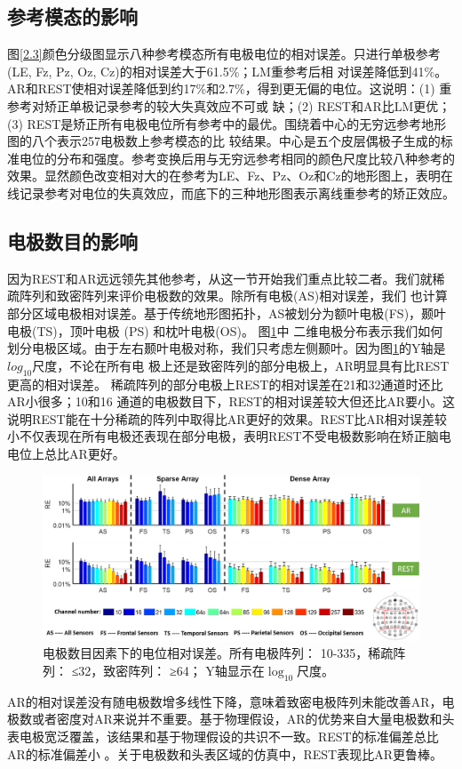 \subsection{参考模态的影响}
图\ref{2.3}颜色分级图显示八种参考模态所有电极电位的相对误差。只进行单极参考(LE, Fz, Pz, Oz, Cz)的相对误差大于61.5\%；LM重参考后相
对误差降低到41\%。AR和REST使相对误差降低到约17\%和2.7\%，得到更无偏的电位。这说明：(1) 重参考对矫正单极记录参考的较大失真效应不可或
缺；(2) REST和AR比LM更优；(3) REST是矫正所有电极电位所有参考中的最优。围绕着中心的无穷远参考地形图的八个表示257电极数上参考模态的比
较结果。中心是五个皮层偶极子生成的标准电位的分布和强度。参考变换后用与无穷远参考相同的颜色尺度比较八种参考的效果。显然颜色改变相对大的在参考为LE、Fz、Pz、Oz和Cz的地形图上，表明在线记录参考对电位的失真效应，而底下的三种地形图表示离线重参考的矫正效应。
\subsection{电极数目的影响}
因为REST和AR远远领先其他参考，从这一节开始我们重点比较二者。我们就稀疏阵列和致密阵列来评价电极数的效果。除所有电极(AS)相对误差，我们
也计算部分区域电极相对误差。基于传统地形图拓扑，AS被划分为额叶电极(FS)，颞叶电极(TS)，顶叶电极 (PS) 和枕叶电极(OS)。 图\ref{2.4}中
二维电极分布表示我们如何划分电极区域。由于左右颞叶电极对称，我们只考虑左侧颞叶。因为图\ref{2.4}的Y轴是$log_{10}$尺度，不论在所有电
极上还是致密阵列的部分电极上，AR明显具有比REST更高的相对误差。 稀疏阵列的部分电极上REST的相对误差在21和32通道时还比AR小很多；10和16
通道的电极数目下，REST的相对误差较大但还比AR要小。这说明REST能在十分稀疏的阵列中取得比AR更好的效果。REST比AR相对误差较小不仅表现在所有电极还表现在部分电极，表明REST不受电极数影响在矫正脑电电位上总比AR更好。
\begin{figure}[!ht]
	\centering
	\includegraphics[width=15cm]{pic/JNE/figure4.png}
	\caption{电极数目因素下的电位相对误差。所有电极阵列： 10-335，稀疏阵列： ≤32，致密阵列： ≥64； Y轴显示在$\log_{10}$尺度。}
	\label{2.4}
\end{figure}
AR的相对误差没有随电极数增多线性下降，意味着致密电极阵列未能改善AR，电极数或者密度对AR来说并不重要。基于物理假设，AR的优势来自大量电极数和头表电极宽泛覆盖，该结果和基于物理假设的共识不一致。REST的标准偏差总比AR的标准偏差小
。关于电极数和头表区域的仿真中，REST表现比AR更鲁棒。

